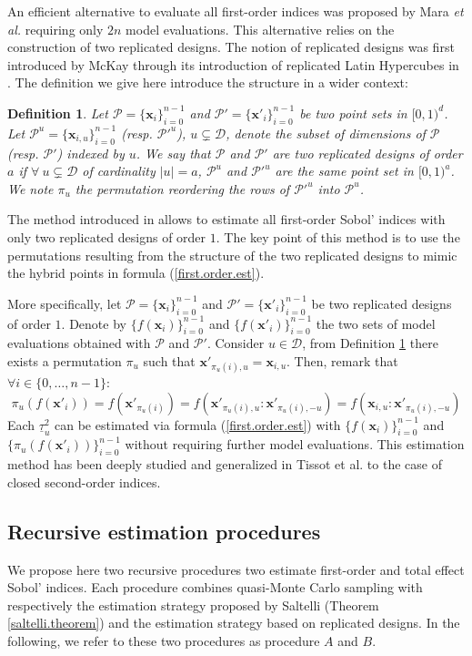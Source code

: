 \documentclass[]{elsarticle}
\newtheorem{definition}{Definition}
\theoremstyle{definition}
\newcommand{\bvec}[1]{\boldsymbol{#1}}
\newcommand{\vx}{\bvec{x}}
\begin{document}
An efficient alternative to evaluate all first-order indices was proposed by Mara \textit{et al.} \cite{Mara}  requiring only $2n$ model evaluations. This alternative relies on the construction of two replicated designs. The notion of replicated designs was first introduced by McKay through its introduction of replicated Latin Hypercubes in \cite{Mckay}. The definition we give here introduce the structure in a wider context:
\begin{definition}
\label{rep.designs}
Let $\mathcal{P}=\{\vx_i\}_{i=0}^{n-1}$ and $\mathcal{P}'=\{{\vx'}_i\}_{i=0}^{n-1}$ be two point sets in
$[0,1)^{d}$. Let $\mathcal{P}^u=\{\vx_{i,u}\}_{i=0}^{n-1}$ (resp. ${\mathcal{P}'}^u$), $u \subsetneq \mathcal{D}$, denote the subset of dimensions of $\mathcal{P}$ (resp. $\mathcal{P}'$) indexed by $u$. We say that $\mathcal{P}$ and $\mathcal{P}'$ are two replicated designs of order $a$ if $\forall \ u \subsetneq \mathcal{D}$ of cardinality $|u|=a$, $\mathcal{P}^u$ and ${\mathcal{P}'}^u$ are the same point set in $[0,1)^a$. We note $\pi_u$ the permutation reordering the rows of ${\mathcal{P}'}^u$ into $\mathcal{P}^u$.
\end{definition}
The method introduced in \cite{Mara} allows to estimate all first-order Sobol' indices with only two replicated designs of order $1$. The key point of this method is to use the permutations resulting from the structure of the two replicated designs to mimic the hybrid points in formula (\ref{first.order.est}). 

More specifically, let $\mathcal{P}=\{\vx_i\}_{i=0}^{n-1}$ and $\mathcal{P}'=\{{\vx'}_i\}_{i=0}^{n-1}$ be two replicated designs of order $1$. Denote by $\{f(\vx_i)\}_{i=0}^{n-1}$ and $\{f({\vx'}_i)\}_{i=0}^{n-1}$ the two sets of model evaluations obtained with $\mathcal{P}$ and $\mathcal{P}'$. Consider $u \in \mathcal{D}$, from Definition \ref{rep.designs} there exists a permutation $\pi_u$ such that ${\vx'}_{\pi_u(i),u}={\vx}_{i,u}$. Then, remark that $\forall i \in \{0,\dots,n-1\}$:
\[\pi_u(f({\vx'}_i))=f({\vx'}_{\pi_u(i)})=f(\vx'_{\pi_u(i),u}:{\vx'}_{\pi_u(i),-u})=f(\vx_{i,u}:{\vx'}_{\pi_u(i),-u})\]
Each $\underline{\tau}^2_u$ can be estimated via formula (\ref{first.order.est}) with $\{f(\vx_i)\}_{i=0}^{n-1}$ and $\{\pi_u(f({\vx'}_i))\}_{i=0}^{n-1}$ without requiring further model evaluations. This estimation method has been deeply studied and generalized in Tissot et al. \cite{Mara} to the case of closed second-order indices.
\bigskip

\subsection{Recursive estimation procedures}
We propose here two recursive procedures two estimate first-order and total effect Sobol' indices. Each procedure combines quasi-Monte Carlo sampling with respectively the estimation strategy proposed by Saltelli (Theorem \ref{saltelli.theorem}) and the estimation strategy based on replicated designs. In the following, we refer to these two procedures as procedure $A$ and $B$.
\bigskip
\end{document}
